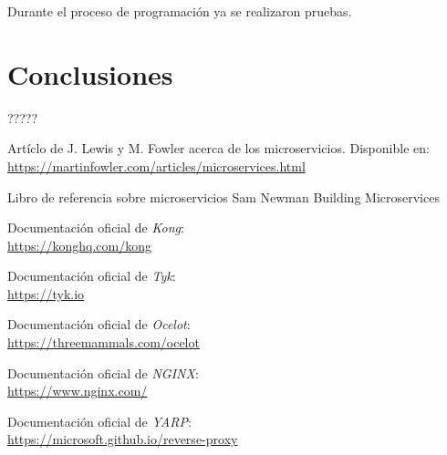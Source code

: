 \documentclass[11pt,spanish,listoffigures]{tfgetsinf}
\begin{document}
Durante el proceso de programación ya se realizaron pruebas.


\chapter{Conclusiones}

?????


\begin{thebibliography}{10}

	Artíclo de J. Lewis y M. Fowler acerca de los microservicios.
	\newblock Disponible en:\\
	\url{https://martinfowler.com/articles/microservices.html}

	Libro de referencia sobre microservicios
	\newblock Sam Newman
	\newblock Building Microservices

	Documentación oficial de \emph{Kong}:\\
	\url{https://konghq.com/kong}

	Documentación oficial de \emph{Tyk}:\\
	\url{https://tyk.io}

	Documentación oficial de \emph{Ocelot}:\\
	\url{https://threemammals.com/ocelot}

	Documentación oficial de \emph{NGINX}:\\
	\url{https://www.nginx.com/}

	Documentación oficial de \emph{YARP}:\\
	\url{https://microsoft.github.io/reverse-proxy}

\end{thebibliography}
\end{document}
